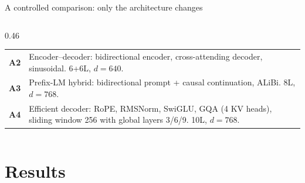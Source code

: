\documentclass[aspectratio=169,11pt]{beamer}
\begin{document}
\begin{frame}{A controlled comparison: only the architecture changes}
\begin{columns}[T]
\begin{column}{0.46\textwidth}
\begin{tabularx}{\textwidth}{@{}lX@{}}
        \textcolor{cA2}{\textbf{A2}} & Encoder--decoder: bidirectional encoder, cross-attending decoder, sinusoidal. 6+6L, $d{=}640$.\\
        \textcolor{cA3}{\textbf{A3}} & Prefix-LM hybrid: bidirectional prompt + causal continuation, ALiBi. 8L, $d{=}768$.\\
        \textcolor{cA4}{\textbf{A4}} & Efficient decoder: RoPE, RMSNorm, SwiGLU, GQA (4 KV heads), sliding window 256 with global layers 3/6/9. 10L, $d{=}768$.\\
        \bottomrule
      \end{tabularx}
    \end{column}
  \end{columns}
\end{frame}

\section{Results}
\end{document}
